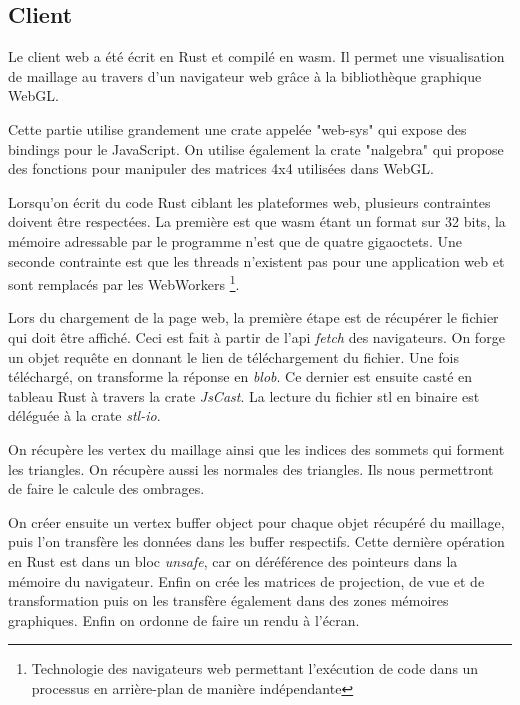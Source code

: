 \subsection{Client}

Le client web a été écrit en Rust et compilé en \gls{wasm}.
Il permet une visualisation de maillage au travers d'un navigateur web grâce à
la bibliothèque graphique WebGL.

Cette partie utilise grandement une crate appelée "web-sys" qui expose des bindings pour le JavaScript.
On utilise également la crate "nalgebra" qui propose des fonctions pour manipuler des matrices 4x4 utilisées dans WebGL.

Lorsqu'on écrit du code Rust ciblant les plateformes web, plusieurs contraintes
doivent être respectées. La première est que \gls{wasm} étant un format sur 32
bits, la mémoire adressable par le programme n'est que de quatre gigaoctets. Une
seconde contrainte est que les threads n'existent pas pour une application web
et sont remplacés par les WebWorkers
\footnote{Technologie des navigateurs web permettant l'exécution de
code dans un processus en arrière-plan de manière indépendante}.

Lors du chargement de la page web, la première étape est de récupérer le fichier
qui doit être affiché.
Ceci est fait à partir de l'\gls{api} \textit{fetch} des
navigateurs. On forge un objet requête en donnant le lien de téléchargement du
fichier. Une fois téléchargé, on transforme la réponse en \textit{blob}.
Ce dernier est ensuite casté en tableau Rust à travers la crate \textit{JsCast}.
La lecture du fichier \gls{stl} en binaire est déléguée à la crate \textit{stl-io}.

On récupère les vertex du maillage ainsi que les indices des sommets qui forment les
triangles. On récupère aussi les normales des triangles. Ils nous permettront de
faire le calcule des ombrages.

On créer ensuite un vertex buffer object pour chaque objet récupéré du
maillage, puis l'on transfère les données dans les buffer respectifs.
Cette dernière opération en Rust est dans un bloc \textit{unsafe}, car on déréférence des
pointeurs dans la mémoire du navigateur.
Enfin on crée les matrices de projection, de vue et de transformation 
puis on les transfère également dans des zones mémoires graphiques.
Enfin on ordonne de faire un rendu à l'écran.
